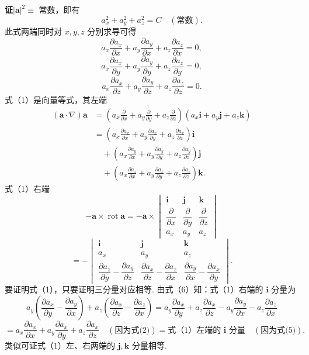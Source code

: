\documentclass[UTF8, 12pt, fontset=fandol, oneside]{ctexart}
\begin{document}
\noindent\textbf{证}\quad $|\mathbf a|^2\equiv$ 常数，即有
\[
a_x^2+a_y^2+a_z^2=C\quad(\text{常数}).
\]
此式两端同时对 $x,y,z$ 分别求导可得
\[
a_x\frac{\partial a_x}{\partial x}+a_y\frac{\partial a_y}{\partial x}+a_z\frac{\partial a_z}{\partial x}=0, \tag{2}
\]
\[
a_x\frac{\partial a_x}{\partial y}+a_y\frac{\partial a_y}{\partial y}+a_z\frac{\partial a_z}{\partial y}=0, \tag{3}
\]
\[
a_x\frac{\partial a_x}{\partial z}+a_y\frac{\partial a_y}{\partial z}+a_z\frac{\partial a_z}{\partial z}=0. \tag{4}
\]
式（1）是向量等式，其左端
\[
\begin{aligned}
(\mathbf a\cdot\nabla)\mathbf a
&=\left(a_x\frac\partial{\partial x}+a_y\frac\partial{\partial y}+a_z\frac\partial{\partial z}\right)(a_x\mathbf i+a_y\mathbf j+a_z\mathbf k)\\
&=\left(a_x\frac{\partial a_x}{\partial x}+a_y\frac{\partial a_x}{\partial y}+a_z\frac{\partial a_x}{\partial z}\right)\mathbf i\\
&\quad+\left(a_x\frac{\partial a_y}{\partial x}+a_y\frac{\partial a_y}{\partial y}+a_z\frac{\partial a_y}{\partial z}\right)\mathbf j\\
&\quad+\left(a_x\frac{\partial a_z}{\partial x}+a_y\frac{\partial a_z}{\partial y}+a_z\frac{\partial a_z}{\partial z}\right)\mathbf k.
\end{aligned}
\tag{5}
\]
式（1）右端
\[
-\mathbf a\times\operatorname{rot}\mathbf a
=-\mathbf a\times
\begin{vmatrix}
\mathbf i & \mathbf j & \mathbf k\\
\dfrac{\partial}{\partial x} & \dfrac{\partial}{\partial y} & \dfrac{\partial}{\partial z}\\
a_x & a_y & a_z
\end{vmatrix}
\]
\[
=-
\begin{vmatrix}
\mathbf i & \mathbf j & \mathbf k\\
a_x & a_y & a_z\\
\dfrac{\partial a_z}{\partial y}-\dfrac{\partial a_y}{\partial z} &
\dfrac{\partial a_x}{\partial z}-\dfrac{\partial a_z}{\partial x} &
\dfrac{\partial a_y}{\partial x}-\dfrac{\partial a_x}{\partial y}
\end{vmatrix}. \tag{6}
\]
要证明式（1），只要证明三分量对应相等. 由式（6）知：式（1）右端的 $\mathbf i$ 分量为
\[
a_y\left(\frac{\partial a_x}{\partial y}-\frac{\partial a_y}{\partial x}\right)
+a_z\left(\frac{\partial a_x}{\partial z}-\frac{\partial a_z}{\partial x}\right)
=a_y\frac{\partial a_x}{\partial y}+a_z\frac{\partial a_x}{\partial z}
-a_y\frac{\partial a_y}{\partial x}-a_z\frac{\partial a_z}{\partial x}
\]
\[
=a_x\frac{\partial a_x}{\partial x}
+a_y\frac{\partial a_x}{\partial y}
+a_z\frac{\partial a_x}{\partial z}\quad(\text{因为式(2)})
=\text{式（1）左端的 $\mathbf i$ 分量}\quad(\text{因为式(5)}).
\]
类似可证式（1）左、右两端的 $\mathbf j,\mathbf k$ 分量相等.
\end{document}
